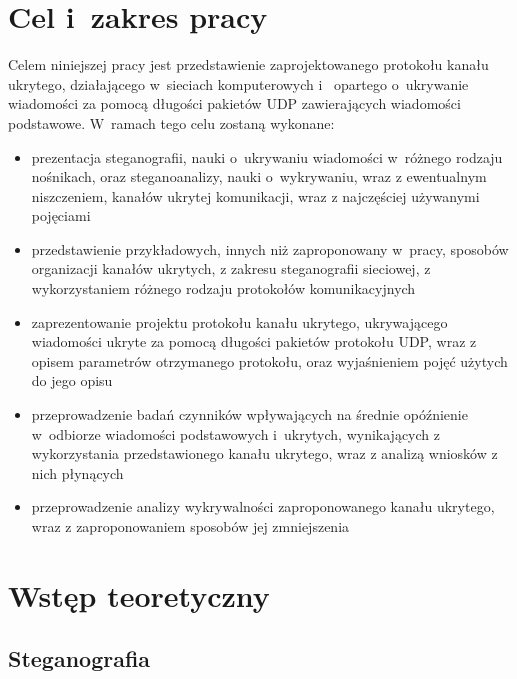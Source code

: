 \documentclass[a4paper, twoside, 12pt]{report}
\begin{document}
\tableofcontents

\listoffigures

\chapter{Cel i~zakres pracy}
    Celem niniejszej pracy jest przedstawienie zaprojektowanego protokołu kanału
    ukrytego, działającego w~sieciach komputerowych i~ opartego o~ukrywanie wiadomości za pomocą długości pakietów UDP
    zawierających wiadomości podstawowe. W~ramach tego celu zostaną wykonane:
    \begin{itemize}
        \item prezentacja steganografii, nauki o~ukrywaniu wiadomości w~różnego rodzaju nośnikach,
            oraz steganoanalizy, nauki o~wykrywaniu, wraz z ewentualnym niszczeniem, kanałów
            ukrytej komunikacji, wraz z najczęściej używanymi pojęciami
        \item przedstawienie przykładowych, innych niż zaproponowany w~pracy,
            sposobów organizacji kanałów ukrytych, z zakresu steganografii sieciowej,
            z wykorzystaniem różnego rodzaju protokołów komunikacyjnych
        \item zaprezentowanie projektu protokołu kanału ukrytego, ukrywającego
            wiadomości ukryte za pomocą długości pakietów protokołu UDP, wraz
            z opisem parametrów otrzymanego protokołu, oraz wyjaśnieniem pojęć
            użytych do jego opisu
        \item przeprowadzenie badań czynników wpływających na średnie opóźnienie
            w~odbiorze wiadomości podstawowych i~ukrytych, wynikających z wykorzystania
            przedstawionego kanału ukrytego, wraz z analizą wniosków
            z nich płynących
        \item przeprowadzenie analizy wykrywalności zaproponowanego kanału ukrytego,
            wraz z zaproponowaniem sposobów jej zmniejszenia
    \end{itemize}

\chapter{Wstęp teoretyczny}
    \section{Steganografia}
\end{document}
